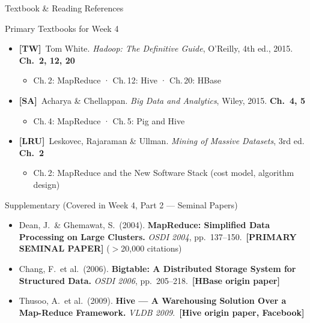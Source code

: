 \documentclass[aspectratio=169,10pt]{beamer}
\begin{document}
\begin{frame}{Textbook \& Reading References}
  \begin{block}{Primary Textbooks for Week 4}
    \begin{itemize}
      \item \textbf{[TW]}\ Tom White. \textit{Hadoop: The Definitive Guide}, O'Reilly, 4th ed., 2015.
            \hfill \textbf{Ch.\ 2, 12, 20}
            \begin{itemize}
              \small\item Ch.\,2: MapReduce · Ch.\,12: Hive · Ch.\,20: HBase
            \end{itemize}
      \item \textbf{[SA]}\ Acharya \& Chellappan. \textit{Big Data and Analytics}, Wiley, 2015.
            \hfill \textbf{Ch.\ 4, 5}
            \begin{itemize}
              \small\item Ch.\,4: MapReduce · Ch.\,5: Pig and Hive
            \end{itemize}
      \item \textbf{[LRU]}\ Leskovec, Rajaraman \& Ullman. \textit{Mining of Massive Datasets}, 3rd ed.
            \hfill \textbf{Ch.\ 2}
            \begin{itemize}
              \small\item Ch.\,2: MapReduce and the New Software Stack (cost model, algorithm design)
            \end{itemize}
    \end{itemize}
  \end{block}
  \vspace{6pt}
  \begin{exampleblock}{Supplementary (Covered in Week 4, Part 2 — Seminal Papers)}
    \begin{itemize}
      \small
      \item Dean, J.\ \& Ghemawat, S.\ (2004). \textbf{MapReduce: Simplified Data Processing on Large Clusters.}
            \textit{OSDI 2004}, pp.\ 137--150.\ \textbf{[PRIMARY SEMINAL PAPER]} ($>$20{,}000 citations)
      \item Chang, F.\ et al.\ (2006). \textbf{Bigtable: A Distributed Storage System for Structured Data.}
            \textit{OSDI 2006}, pp.\ 205--218.\ \textbf{[HBase origin paper]}
      \item Thusoo, A.\ et al.\ (2009). \textbf{Hive — A Warehousing Solution Over a Map-Reduce Framework.}
            \textit{VLDB 2009}.\ \textbf{[Hive origin paper, Facebook]}
    \end{itemize}
  \end{exampleblock}
\end{frame}
\end{document}
